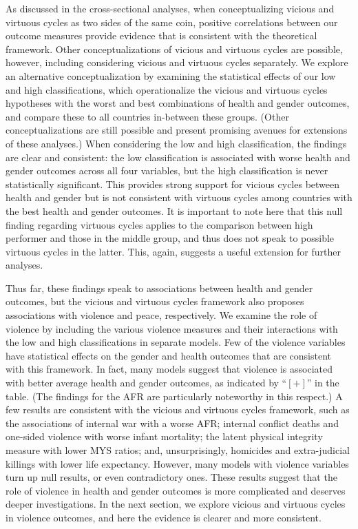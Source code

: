 \documentclass[12pt]{article}
\begin{document}
As discussed in the cross-sectional analyses, when conceptualizing vicious and virtuous cycles as two sides of the same coin, positive correlations between our outcome measures provide evidence that is consistent with the theoretical framework.
Other conceptualizations of vicious and virtuous cycles are possible, however, including considering vicious and virtuous cycles separately.
We explore an alternative conceptualization by examining the statistical effects of our low and high classifications, which operationalize the vicious and virtuous cycles hypotheses with the worst and best combinations of health and gender outcomes, and compare these to all countries in-between these groups. (Other conceptualizations are still possible and present promising avenues for extensions of these analyses.)
When considering the low and high classification, the findings are clear and consistent: the low classification is associated with worse health and gender outcomes across all four variables, but the high classification is never statistically significant.
This provides strong support for vicious cycles between health and gender but is not consistent with virtuous cycles among countries with the best health and gender outcomes.
It is important to note here that this null finding regarding virtuous cycles applies to the comparison between high performer and those in the middle group, and thus does not speak to possible virtuous cycles in the latter. This, again, suggests a useful extension for further analyses.

Thus far, these findings speak to associations between health and gender outcomes, but the vicious and virtuous cycles framework also proposes associations with violence and peace, respectively.
We examine the role of violence by including the various violence measures and their interactions with the low and high classifications in separate models.
Few of the violence variables have statistical effects on the gender and health outcomes that are consistent with this framework.
In fact, many models suggest that violence is associated with better average health and gender outcomes, as indicated by \enquote{$[+]$} in the table.
(The findings for the AFR are particularly noteworthy in this respect.)
A few results are consistent with the vicious and virtuous cycles framework, such as the associations of internal war with a worse AFR; internal conflict deaths and one-sided violence with worse infant mortality; the latent physical integrity measure with lower MYS ratios; and, unsurprisingly, homicides and extra-judicial killings with lower life expectancy.
However, many models with violence variables turn up null results, or even contradictory ones.
These results suggest that the role of violence in health and gender outcomes is more complicated and deserves deeper investigations.
In the next section, we explore vicious and virtuous cycles in violence outcomes, and here the evidence is clearer and more consistent.
\end{document}
